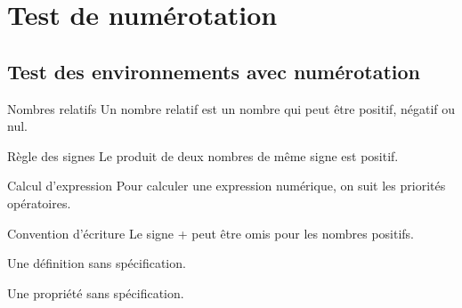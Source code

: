\documentclass{book}
\begin{document}
\chapter{Test de numérotation}

\section{Test des environnements avec numérotation}

\begin{definitionbox}{Nombres relatifs}
Un nombre relatif est un nombre qui peut être positif, négatif ou nul.
\end{definitionbox}

\begin{proprietebox}{Règle des signes}
Le produit de deux nombres de même signe est positif.
\end{proprietebox}

\begin{methodebox}{Calcul d'expression}
Pour calculer une expression numérique, on suit les priorités opératoires.
\end{methodebox}

\begin{remarkbox}{Convention d'écriture}
Le signe + peut être omis pour les nombres positifs.
\end{remarkbox}

\begin{definitionbox}
Une définition sans spécification.
\end{definitionbox}

\begin{proprietebox}
Une propriété sans spécification.
\end{proprietebox}
\end{document}
